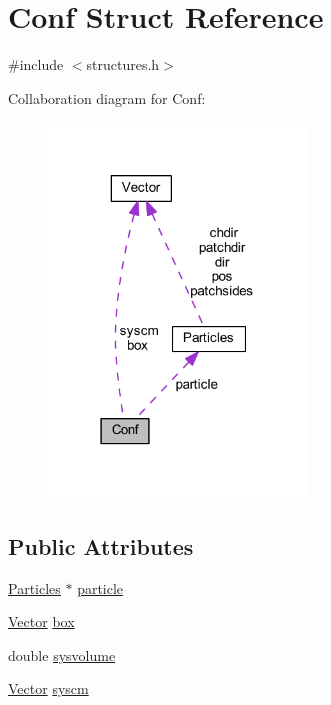 \hypertarget{struct_conf}{\section{Conf Struct Reference}
\label{struct_conf}
}


{\ttfamily \#include $<$structures.\+h$>$}



Collaboration diagram for Conf\+:\nopagebreak
\begin{figure}[H]
\begin{center}
\leavevmode
\includegraphics[width=195pt]{struct_conf__coll__graph}
\end{center}
\end{figure}
\subsection*{Public Attributes}
\begin{DoxyCompactItemize}
\item 
\hyperlink{struct_particles}{Particles} $\ast$ \hyperlink{struct_conf_ac0e11d5fd0a32540825f5e051ce07e40}{particle}
\item 
\hyperlink{class_vector}{Vector} \hyperlink{struct_conf_a98e73199812404fd886619f90f0b26e7}{box}
\item 
double \hyperlink{struct_conf_a0591e720e4f06449a7d37a8e3135ddb1}{sysvolume}
\item 
\hyperlink{class_vector}{Vector} \hyperlink{struct_conf_a8d27bcc5bf535c39c7c0f17a078448d9}{syscm}
\end{DoxyCompactItemize}


